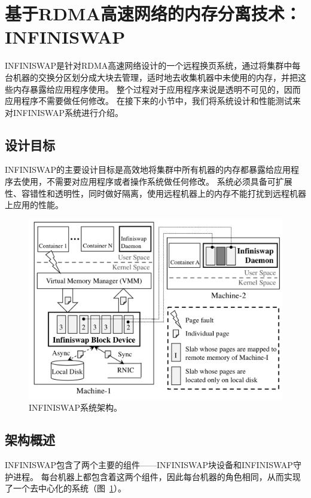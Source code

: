 
\section{基于RDMA高速网络的内存分离技术：INFINISWAP}

INFINISWAP是针对RDMA高速网络设计的一个远程换页系统，通过将集群中每台机器的交换分区划分成大块去管理，适时地去收集机器中未使用的内存，并把这些内存暴露给应用程序使用。
整个过程对于应用程序来说是透明不可见的，因而应用程序不需要做任何修改。
在接下来的小节中，我们将系统设计和性能测试来对INFINISWAP系统进行介绍。

\subsection{设计目标}
INFINISWAP的主要设计目标是高效地将集群中所有机器的内存都暴露给应用程序去使用，不需要对应用程序或者操作系统做任何修改。
系统必须具备可扩展性、容错性和透明性，同时做好隔离，使用远程机器上的内存不能打扰到远程机器上应用的性能。

\begin{figure}
\centering
\includegraphics[scale=0.5]{Figures/memory/infiniswap_architecture.png}
\decoRule
\caption{INFINISWAP系统架构。\cite{gu2017efficient}}
\label{fig:infiniswap_architecture}
\end{figure}

\subsection{架构概述}
INFINISWAP包含了两个主要的组件——INFINISWAP块设备和INFINISWAP守护进程。
每台机器上都包含着这两个组件，因此每台机器的角色相同，从而实现了一个去中心化的系统（图~\ref{fig:infiniswap_architecture}）。

